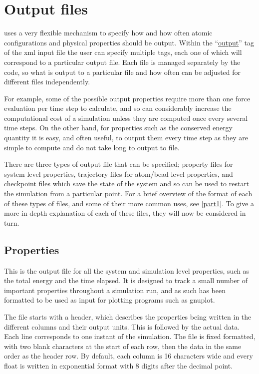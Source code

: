 \documentclass[11pt,english,fleqn]{report}
\begin{document}
\section{Output files}

\label{outputfiles}

\ipi uses a very flexible mechanism to specify how and how often
atomic configurations and physical properties should be output. Within
the {}``\hyperref[OUTPUTS]{output}'' tag of the xml input 
file the user can specify multiple tags, each one of 
which will correspond to a particular output
file. Each file is managed separately by the code, so what is output
to a particular file and how often can be adjusted for different files independently.

For example, some of the possible output properties require more than
one force evaluation per time step to calculate, and so can considerably
increase the computational cost of a simulation unless they are computed
once every several time steps. On the other hand,
for properties such as the conserved energy quantity it is easy, and
often useful, to output them every time step as they are simple to
compute and do not take long to output to file. 

There are three types of output file that can be specified; property
files for system level properties, trajectory files for atom/bead
level properties, and checkpoint files which save the state of the
system and so can be used to restart the simulation from a particular
point. For a brief overview of the format of each of these types of
files, and some of their more common uses, see \ref{part1}.
To give a more in depth explanation of each of these files, 
they will now be considered in turn.


\subsection{Properties}

\label{propertyfile}

This is the output file for all the system and simulation level properties,
such as the total energy and the time elapsed. It is designed to 
track a small number of important properties throughout a
simulation run, and as such has been formatted to be used as input
for plotting programs such as gnuplot.

The file starts with
a header, which describes the properties being written in the different
columns and their output units. This is followed by the actual
data. Each line corresponds to one instant of the simulation.
The file is fixed formatted, with two blank characters at the start
of each row, then the data in the same order as the header row. By default, each
column is 16 characters wide and every float is written in exponential
format with 8 digits after the decimal point.
\end{document}
